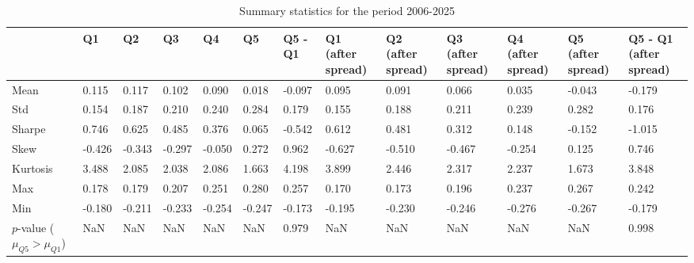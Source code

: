 \begin{table}
\caption{Summary statistics for the period 2006-2025}
\label{tab:summary_2006_2025}
\begin{tabular}{lllllllllllll}
\toprule
 & Q1 & Q2 & Q3 & Q4 & Q5 & Q5 - Q1 & Q1 (after spread) & Q2 (after spread) & Q3 (after spread) & Q4 (after spread) & Q5 (after spread) & Q5 - Q1 (after spread) \\
\midrule
Mean & 0.115 & 0.117 & 0.102 & 0.090 & 0.018 & -0.097 & 0.095 & 0.091 & 0.066 & 0.035 & -0.043 & -0.179 \\
Std & 0.154 & 0.187 & 0.210 & 0.240 & 0.284 & 0.179 & 0.155 & 0.188 & 0.211 & 0.239 & 0.282 & 0.176 \\
Sharpe & 0.746 & 0.625 & 0.485 & 0.376 & 0.065 & -0.542 & 0.612 & 0.481 & 0.312 & 0.148 & -0.152 & -1.015 \\
Skew & -0.426 & -0.343 & -0.297 & -0.050 & 0.272 & 0.962 & -0.627 & -0.510 & -0.467 & -0.254 & 0.125 & 0.746 \\
Kurtosis & 3.488 & 2.085 & 2.038 & 2.086 & 1.663 & 4.198 & 3.899 & 2.446 & 2.317 & 2.237 & 1.673 & 3.848 \\
Max & 0.178 & 0.179 & 0.207 & 0.251 & 0.280 & 0.257 & 0.170 & 0.173 & 0.196 & 0.237 & 0.267 & 0.242 \\
Min & -0.180 & -0.211 & -0.233 & -0.254 & -0.247 & -0.173 & -0.195 & -0.230 & -0.246 & -0.276 & -0.267 & -0.179 \\
$p$-value ($\mu_{Q5} > \mu_{Q1}$) & NaN & NaN & NaN & NaN & NaN & 0.979 & NaN & NaN & NaN & NaN & NaN & 0.998 \\
\bottomrule
\end{tabular}
\end{table}
